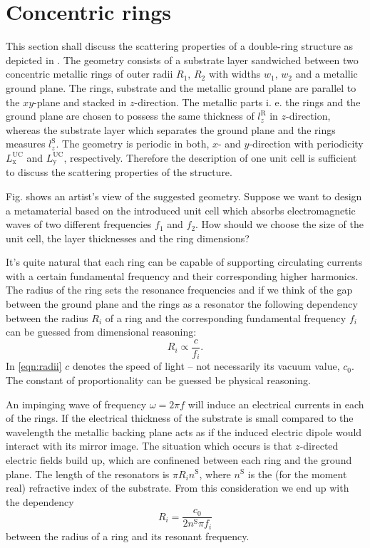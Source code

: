 \section{Concentric rings}
\label{sec:double_rings}
This section shall discuss the scattering properties of a double-ring structure as depicted in . 
The geometry consists of a substrate layer sandwiched between two concentric metallic rings of outer radii $R_{1},\,R_{2}$ with widths $w_1,\,w_2$ and a metallic ground plane. The rings, substrate and the metallic ground plane are parallel to the $xy$-plane and stacked in $z$-direction.
The metallic parts i. e. the rings and the ground plane are chosen to possess  the same thickness of $l_z^{\mathrm{R}}$ in $z$-direction, whereas the substrate layer which separates the ground plane and the rings measures $l_z^{\mathrm{S}}$.
The geometry is periodic in both, $x$- and $y$-direction with periodicity $L_\mathrm{x}^\mathrm{UC}$ and $L_\mathrm{y}^\mathrm{UC}$, respectively. Therefore the description of one unit cell is sufficient to discuss the scattering properties of the structure.

Fig.  shows an artist's view of the suggested geometry. Suppose we want to design a metamaterial based on the introduced unit cell which absorbs electromagnetic waves of two different frequencies $f_1$ and $f_2$. How should we choose the size of the unit cell, the layer thicknesses and the ring dimensions? 

It's quite natural that each ring can be capable of supporting circulating currents with a certain fundamental frequency and their corresponding higher harmonics. The radius of the ring sets the resonance frequencies and if we think of the gap between the ground plane and the rings as a resonator the following dependency between the radius $R_i$ of a ring and the corresponding fundamental frequency $f_i$ can be guessed from dimensional reasoning:
\begin{equation}
R_i \propto \frac{c}{f_i}.
\label{eqn:radii}
\end{equation}
In \cref{eqn:radii} $c$ denotes the speed of light -- not necessarily its vacuum value, $c_0$. The constant of proportionality can be guessed be physical reasoning. 

An impinging wave of frequency $\omega = 2\pi f$ will induce an electrical currents in each of the rings. If the electrical thickness of the substrate is small compared to the wavelength the metallic backing plane acts as if the induced electric dipole would interact with its mirror image. The situation which occurs is that $z$-directed electric fields build up, which are confinened between each ring and the ground plane.
The length of the resonators is $\pi R_i n^\mathrm{S}$, where $n^\mathrm{S}$ is the (for the moment real) refractive index of the substrate.
From this consideration we end up with the dependency
\begin{equation}
R_i = \frac{c_0}{2 n^\mathrm{S}\pi f_i}
\label{eqn:radii_precise}
\end{equation}
between the radius of a ring and its resonant frequency.

